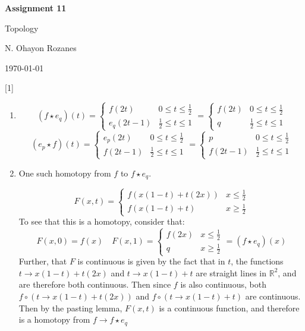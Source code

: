 \documentclass{article} %
\newcommand{\question}[2][]{
  \begin{flushleft}
    \textbf{Question #1}: \textit{#2}

\end{flushleft}}
\newcommand{\maketitletwo}[2][]{
  \begin{center}
    \Large{\textbf{Assignment #1}

    Topology} %
    \vspace{5pt}

    \normalsize{N. Ohayon Rozanes  %

    \today}        %
    \vspace{15pt}

\end{center}}
\begin{document}
\maketitletwo[11]  %

\question[1]{}
\begin{enumerate}
  \item
    \[
      (f \star e_q)(t)  =
      \begin{cases}
        f(2t) & 0 \le t \le \frac{1}{2}\\
        e_q(2t-1) & \frac{1}{2} \le t \le 1
      \end{cases} =
      \begin{cases}
        f(2t) & 0 \le t \le \frac{1}{2}\\
        q & \frac{1}{2} \le t \le 1
      \end{cases}
    \]
    \[
      (e_p \star f)(t)  =
      \begin{cases}
        e_p(2t) & 0 \le t \le \frac{1}{2}\\
        f(2t-1) & \frac{1}{2} \le t \le 1
      \end{cases} =
      \begin{cases}
        p & 0 \le t \le \frac{1}{2}\\
        f(2t-1) & \frac{1}{2} \le t \le 1
      \end{cases}
    \]
  \item One such homotopy from $f$ to $f \star e_q$.

    \[
      F(x,t) =
      \begin{cases}
        f(x(1-t) + t(2x)) & x \le \frac{1}{2} \\
        f(x(1-t) + t) & x \ge \frac{1}{2}
      \end{cases}
    \]
    To see that this is a homotopy, consider that:
    \[
      F(x, 0) = f(x) \quad F(x, 1) =
      \begin{cases}
        f(2x) & x\le \frac{1}{2} \\
        q & x\ge \frac{1}{2}
      \end{cases}
      = (f\star e_q)(x)
    \]
    Further, that $F$ is continuous is given by the fact that in $t$,
    the functions $t \to x(1-t)+ t(2x)$ and $t \to x(1-t) + t$ are
    straight lines in $\mathbb{R}^2$, and are therefore both
    continuous. Then since $f$ is also continuous, both $f \circ (t \to x(1-t)
    + t(2x))$ and $f \circ (t \to x(1-t) + t)$ are continuous. Then
    by the pasting lemma, $F(x,t)$ is a continuous function, and
    therefore is a homotopy from $f \to f\star e_q$

\end{enumerate}
\end{document}
